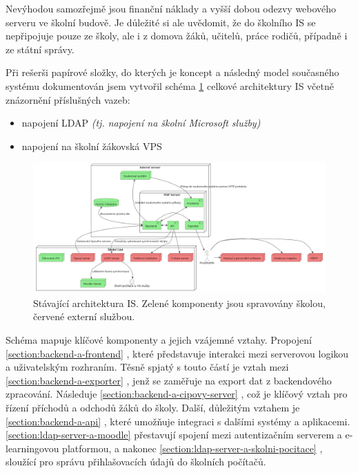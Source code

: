 \documentclass[FM,Proj]{tulthesis}
\begin{document}
Nevýhodou samozřejmě jsou finanční náklady a vyšší dobou odezvy webového serveru 
ve školní budově. Je důležité si ale uvědomit, že do školního IS se nepřipojuje 
pouze ze školy, ale i z domova žáků, učitelů, práce rodičů, případně i ze státní správy.  

Při rešerši papírové složky, do kterých je koncept a následný model současného systému dokumentován
jsem vytvořil schéma \ref{fig:puvodni-architektura} celkové architektury IS včetně znázornění 
příslušných vazeb:
\begin{itemize}
    \item napojení LDAP \textit{(tj. napojení na školní Microsoft služby)}
    \item napojení na školní žákovská VPS
\end{itemize}

\begin{landscape}
    \begin{figure}[H]
        \includegraphics[width=\linewidth]{architektura-puvodni.png}
        \caption{Stávající architektura IS. Zelené komponenty jsou
        spravovány školou, červené externí službou.}
        \label{fig:puvodni-architektura}
    \end{figure}
\end{landscape}

Schéma mapuje klíčové komponenty a jejich vzájemné vztahy. Propojení \ref{section:backend-a-frontend}
, které představuje interakci mezi serverovou logikou a uživatelským
rozhraním. Těsně spjatý s touto částí je vztah mezi \ref{section:backend-a-exporter} 
, jenž se zaměřuje na export dat z backendového zpracování. 
Následuje \ref{section:backend-a-cipovy-server} , což je klíčový 
vztah pro řízení příchodů a odchodů žáků do školy. Další, důležitým vztahem je \ref{section:backend-a-api} 
, které umožňuje integraci s dalšími systémy a aplikacemi. 
\ref{section:ldap-server-a-moodle}  přestavují spojení mezi 
autentizačním serverem a e-learningovou platformou, a nakonec \ref{section:ldap-server-a-skolni-pocitace} 
, sloužící pro správu přihlašovacích údajů do školních počítačů.
\end{document}
